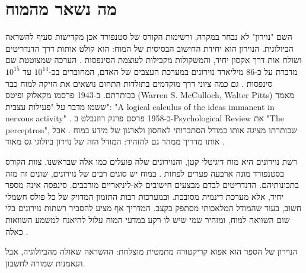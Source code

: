 \section{מה נשאר מהמוח}
השם "נוירון" לא נבחר במקרה, ורשימות הקורס של סטנפורד אכן מקדישות סעיף להשראה הביולוגית. הנוירון הוא יחידת החישוב הבסיסית של המוח: הוא קולט אותות דרך הדנדריטים ושולח אות דרך אקסון יחיד, והמשקולות מקבילות לעוצמת הסינפסות \cite{S-ch03-01}. הערכה שמצוטטת שם מדברת על כ-86 מיליארד נוירונים במערכת העצבים של האדם, המחוברים בכ-$10^{14}$ עד $10^{15}$ סינפסות \cite{S-ch03-01}.
גם כמה ציוני דרך מוקדמים בתולדות התחום נושאים את הזיקה למוח כבר בכותרתם. ב-1943 פרסמו מקאלוק ופיטס (Warren S. McCulloch, Walter Pitts) מאמר ששמו מדבר על "פעילות עצבית": "A logical calculus of the ideas immanent in nervous activity" \cite{S-ch03-04}. ב-1958 פרסם פרנק רוזנבלט ב-Psychological Review את "The perceptron", שכותרתו מציגה אותו כמודל הסתברותי לאחסון ולארגון של מידע במוח \cite{S-ch03-03}.
אבל אותו מדריך ממהר גם להזהיר: המודל הזה של נוירון ביולוגי גס מאוד \cite{S-ch03-01}.
\begin{mythbox}
\mythlabel רשת נוירונים היא מוח דיגיטלי קטן, והנוירונים שלה פועלים כמו אלה שבראשנו.
\tcblower
\realitylabel צוות הקורס בסטנפורד מונה ארבעה פערים לפחות \cite{S-ch03-01}. במוח יש סוגים רבים של נוירונים, שונים זה מזה בתכונותיהם. הדנדריטים לבדם מבצעים חישובים לא-ליניאריים מורכבים. סינפסה אינה מספר יחיד, אלא מערכת דינמית מסובכת. ובמערכות רבות התזמון המדויק של כל פולס חשמלי חשוב, בעוד שהמודל המלאכותי מסתפק בקצב. המדריך אף מציע להסביר רשתות נוירונים בלי שום השוואה למוח, ומזהיר שמי שיש לו רקע במדעי המוח עלול להיאנח למשמע השוואות כאלה \cite{S-ch03-01}.
\end{mythbox}
הנוירון של הספר הוא אפוא קריקטורה מתמטית מוצלחת: ההשראה שאולה מהביולוגיה, אבל הנאמנות שמורה לחשבון.
